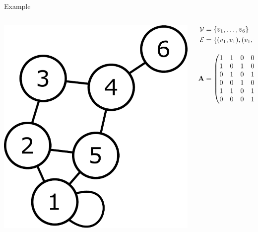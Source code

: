 \begin{frame}{Example}
    \begin{columns}
        \begin{column}{0.5\textwidth}
            \begin{center}
                \includegraphics[height=0.85\textheight]{figures/graph}
            \end{center}
        \end{column}
        \begin{column}{0.5\textwidth}
            \vspace{1em}
            \begin{align*}
                \mathcal{V} &= \left\{ v_{1}, \ldots, v_{6} \right\} \\
                \mathcal{E} &= \left\{ (v_{1}, v_{1}), (v_{1}, v_{2}), \ldots \right\} \\[1em]
                \mathbf{A} &=
                \begin{pmatrix}
                    1 & 1 & 0 & 0 & 1 & 0\\
                    1 & 0 & 1 & 0 & 1 & 0\\
                    0 & 1 & 0 & 1 & 0 & 0\\
                    0 & 0 & 1 & 0 & 1 & 1\\
                    1 & 1 & 0 & 1 & 0 & 0\\
                    0 & 0 & 0 & 1 & 0 & 0\\
                \end{pmatrix}
            \end{align*}
        \end{column}
    \end{columns}
\end{frame}

